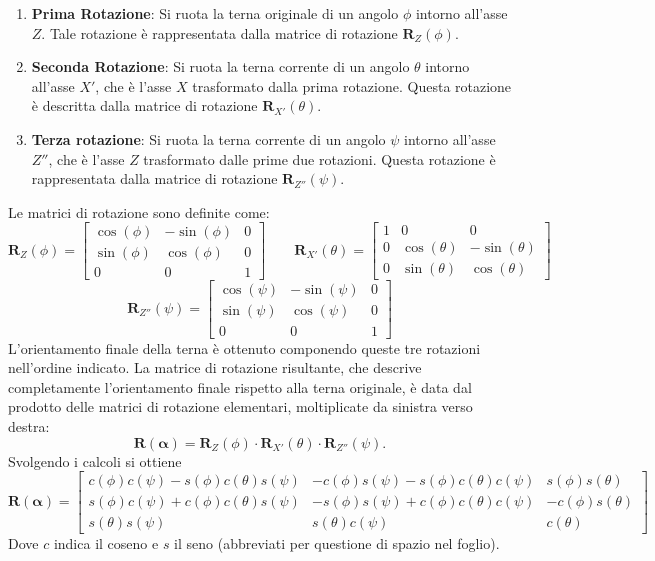 \documentclass[11pt, a4paper]{report}
\begin{document}
\begin{enumerate}
    \item \textbf{Prima Rotazione}: Si ruota la terna originale di un angolo $\phi$ intorno all'asse $Z$. Tale rotazione è rappresentata dalla matrice di rotazione $\mathbf{R}_Z(\phi)$.

    \item \textbf{Seconda Rotazione}: Si ruota la terna corrente di un angolo $\theta$ intorno all'asse $X'$, che è l'asse $X$ trasformato dalla prima rotazione. Questa rotazione è descritta dalla matrice di rotazione $\mathbf{R}_{X'}(\theta)$.

    \item \textbf{Terza rotazione}: Si ruota la terna corrente di un angolo $\psi$ intorno all'asse $Z''$, che è l'asse $Z$ trasformato dalle prime due rotazioni. Questa rotazione è rappresentata dalla matrice di rotazione $\mathbf{R}_{Z''}(\psi)$.
\end{enumerate}
Le matrici di rotazione sono definite come:
\[
    \mathbf{R}_{Z}(\phi) =
    \begin{bmatrix}
        \cos(\phi) & -\sin(\phi) & 0 \\
        \sin(\phi) & \cos(\phi) & 0 \\
        0 & 0 & 1
    \end{bmatrix}
    \qquad
    \mathbf{R}_{X'}(\theta) =
    \begin{bmatrix}
    1 & 0 & 0 \\
    0 & \cos(\theta) & -\sin(\theta) \\
    0 & \sin(\theta) & \cos(\theta)
    \end{bmatrix}
\]
\[
    \mathbf{R}_{Z''}(\psi) =
    \begin{bmatrix}
        \cos(\psi) & -\sin(\psi) & 0 \\
        \sin(\psi) & \cos(\psi) & 0 \\
        0 & 0 & 1
    \end{bmatrix}
\]
\newpage
L'orientamento finale della terna è ottenuto componendo queste tre rotazioni nell'ordine indicato. La matrice di rotazione risultante, che descrive completamente l'orientamento finale rispetto alla terna originale, è data dal prodotto delle matrici di rotazione elementari, moltiplicate da sinistra verso destra:
\[
\mathbf{R}(\boldsymbol{\alpha}) = \mathbf{R}_Z(\phi) \cdot \mathbf{R}_{X'}(\theta) \cdot \mathbf{R}_{Z''}(\psi).
\]
Svolgendo i calcoli si ottiene
\[
    \mathbf{R}(\boldsymbol{\alpha}) =
    \begin{bmatrix}
        c(\phi)c(\psi) - s(\phi)c(\theta)s(\psi) &
        -c(\phi)s(\psi) - s(\phi)c(\theta)c(\psi) &
        s(\phi)s(\theta) \\

        s(\phi)c(\psi) + c(\phi)c(\theta)s(\psi) &
        -s(\phi)s(\psi) + c(\phi)c(\theta)c(\psi) &
        -c(\phi)s(\theta) \\

        s(\theta)s(\psi) &
        s(\theta)c(\psi) &
        c(\theta)
    \end{bmatrix}
\]
Dove $c$ indica il coseno e $s$ il seno (abbreviati per questione di spazio nel foglio).
\end{document}
